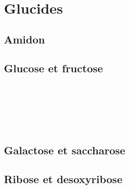 \section{Glucides}

\subsection{Amidon}

\begin{boiteCodeTex}{}
  \chemfig{!\amylopectineHaw}
\end{boiteCodeTex}

\subsection{Glucose et fructose}

\begin{boiteCodeTex}{}
  \chemfig{!\glucoseHaw}
  \chemfig{!\glucoseCycle} \\
  \chemfig{!\glucose} \\[8pt]
  \chemfig{!\glucoseSemiDev}
\end{boiteCodeTex}

\begin{boiteCodeTex}{}
  \chemfig{!\fructoseHaw}
  \chemfig{!\fructofuranoseHaw}
  \chemfig{!\fructoseCycle} \\
  \chemfig{!\fructose} \\[8pt]
  \chemfig{!\fructoseSemiDev}
\end{boiteCodeTex}

\subsection{Galactose et saccharose}

\begin{boiteCodeTex}{}
  \chemfig{!\galactoseHaw}
  \chemfig{!\saccharoseHaw}
\end{boiteCodeTex}

\subsection{Ribose et desoxyribose}

\begin{boiteCodeTex}{}
\end{boiteCodeTex}

\begin{boiteCodeTex}{}
\end{boiteCodeTex}
